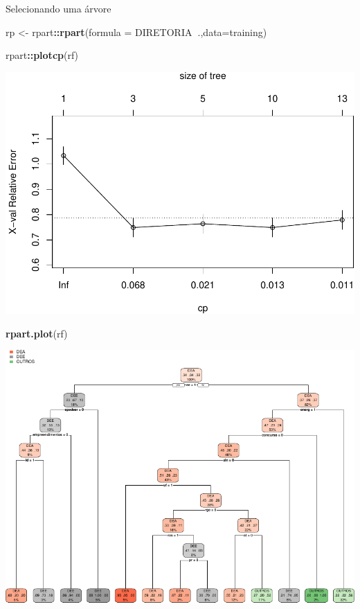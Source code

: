 \documentclass[]{article}
\newenvironment{Shaded}{\begin{snugshade}}{\end{snugshade}}
\newcommand{\KeywordTok}[1]{\textcolor[rgb]{0.13,0.29,0.53}{\textbf{#1}}}
\newcommand{\DataTypeTok}[1]{\textcolor[rgb]{0.13,0.29,0.53}{#1}}
\newcommand{\StringTok}[1]{\textcolor[rgb]{0.31,0.60,0.02}{#1}}
\newcommand{\OperatorTok}[1]{\textcolor[rgb]{0.81,0.36,0.00}{\textbf{#1}}}
\newcommand{\NormalTok}[1]{#1}
\begin{document}
Selecionando uma árvore

\begin{Shaded}
\begin{Highlighting}[]
\NormalTok{rp <-}\StringTok{ }\NormalTok{rpart}\OperatorTok{::}\KeywordTok{rpart}\NormalTok{(}\DataTypeTok{formula =}\NormalTok{ DIRETORIA}\OperatorTok{~}\NormalTok{.,}\DataTypeTok{data=}\NormalTok{training)}
\end{Highlighting}
\end{Shaded}

\begin{Shaded}
\begin{Highlighting}[]
\NormalTok{rpart}\OperatorTok{::}\KeywordTok{plotcp}\NormalTok{(rf)}
\end{Highlighting}
\end{Shaded}

\includegraphics{markdown_v42_files/figure-latex/unnamed-chunk-83-1.pdf}

\begin{Shaded}
\begin{Highlighting}[]
\KeywordTok{rpart.plot}\NormalTok{(rf)}
\end{Highlighting}
\end{Shaded}

\includegraphics{markdown_v42_files/figure-latex/unnamed-chunk-83-2.pdf}
\end{document}
